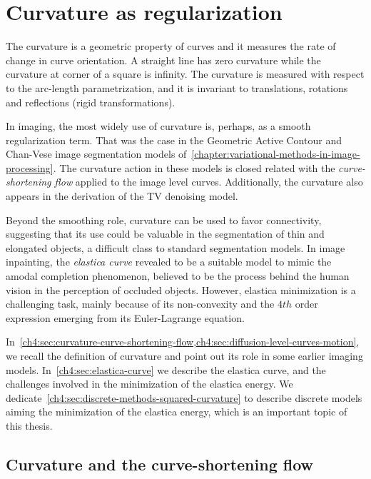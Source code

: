 \chapter{Curvature as regularization}
\label{chapter:curvature-prior}

The curvature is a geometric property of curves and it measures the rate of change in curve orientation. A straight line has zero curvature while the curvature at corner of a square is infinity. The curvature is measured with respect to the arc-length parametrization, and it is invariant to translations, rotations and reflections (rigid transformations).

In imaging, the most widely use of curvature is, perhaps, as a smooth regularization term. That was the case in the Geometric Active Contour and Chan-Vese image segmentation models of~\cref{chapter:variational-methods-in-image-processing}. The curvature action in these models is closed related with the \emph{curve-shortening flow} applied to the image level curves. Additionally, the curvature also appears in the derivation of the TV denoising model.

Beyond the smoothing role, curvature can be used to favor connectivity, suggesting that its use could be valuable in the segmentation of thin and elongated objects, a difficult class to standard segmentation models. In image inpainting, the \emph{elastica curve} revealed to be a suitable model to mimic the amodal completion phenomenon, believed to be the process behind the human vision in the perception of occluded objects. However, elastica minimization is a challenging task, mainly because of its non-convexity and the $4th$ order expression emerging from its Euler-Lagrange equation.

In~\cref{ch4:sec:curvature-curve-shortening-flow,ch4:sec:diffusion-level-curves-motion}, we recall the definition of curvature and point out its role in some earlier imaging models. In~\cref{ch4:sec:elastica-curve} we describe the elastica curve, and the challenges involved in the minimization of the elastica energy. We dedicate~\cref{ch4:sec:discrete-methods-squared-curvature} to describe discrete models aiming the minimization of the elastica energy, which is an important topic of this thesis.



\section{Curvature and the curve-shortening flow}
\label{ch4:sec:curvature-curve-shortening-flow}

